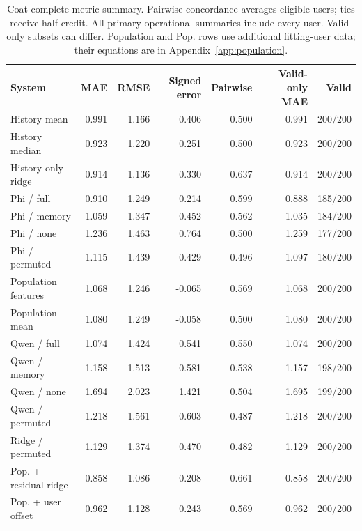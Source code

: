 \begin{table}[t]
\centering\small
\caption{Coat complete metric summary. Pairwise concordance averages eligible users; ties receive half credit. All primary operational summaries include every user. Valid-only subsets can differ. Population and Pop. rows use additional fitting-user data; their equations are in Appendix~\ref{app:population}.}
\label{tab:metrics-coat}
\begin{tabular}{lrrrrrr}
\toprule
System & MAE & RMSE & Signed error & Pairwise & Valid-only MAE & Valid\\
\midrule
History mean & 0.991 & 1.166 & 0.406 & 0.500 & 0.991 & 200/200\\
History median & 0.923 & 1.220 & 0.251 & 0.500 & 0.923 & 200/200\\
History-only ridge & 0.914 & 1.136 & 0.330 & 0.637 & 0.914 & 200/200\\
Phi / full & 0.910 & 1.249 & 0.214 & 0.599 & 0.888 & 185/200\\
Phi / memory & 1.059 & 1.347 & 0.452 & 0.562 & 1.035 & 184/200\\
Phi / none & 1.236 & 1.463 & 0.764 & 0.500 & 1.259 & 177/200\\
Phi / permuted & 1.115 & 1.439 & 0.429 & 0.496 & 1.097 & 180/200\\
Population features & 1.068 & 1.246 & -0.065 & 0.569 & 1.068 & 200/200\\
Population mean & 1.080 & 1.249 & -0.058 & 0.500 & 1.080 & 200/200\\
Qwen / full & 1.074 & 1.424 & 0.541 & 0.550 & 1.074 & 200/200\\
Qwen / memory & 1.158 & 1.513 & 0.581 & 0.538 & 1.157 & 198/200\\
Qwen / none & 1.694 & 2.023 & 1.421 & 0.504 & 1.695 & 199/200\\
Qwen / permuted & 1.218 & 1.561 & 0.603 & 0.487 & 1.218 & 200/200\\
Ridge / permuted & 1.129 & 1.374 & 0.470 & 0.482 & 1.129 & 200/200\\
Pop. + residual ridge & 0.858 & 1.086 & 0.208 & 0.661 & 0.858 & 200/200\\
Pop. + user offset & 0.962 & 1.128 & 0.243 & 0.569 & 0.962 & 200/200\\
\bottomrule
\end{tabular}
\end{table}

